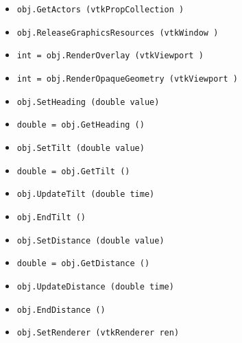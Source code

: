 \begin{itemize}
\item  \verb|obj.GetActors (vtkPropCollection )|

\item  \verb|obj.ReleaseGraphicsResources (vtkWindow )|

\item  \verb|int = obj.RenderOverlay (vtkViewport )|

\item  \verb|int = obj.RenderOpaqueGeometry (vtkViewport )|

\item  \verb|obj.SetHeading (double value)|

\item  \verb|double = obj.GetHeading ()|

\item  \verb|obj.SetTilt (double value)|

\item  \verb|double = obj.GetTilt ()|

\item  \verb|obj.UpdateTilt (double time)|

\item  \verb|obj.EndTilt ()|

\item  \verb|obj.SetDistance (double value)|

\item  \verb|double = obj.GetDistance ()|

\item  \verb|obj.UpdateDistance (double time)|

\item  \verb|obj.EndDistance ()|

\item  \verb|obj.SetRenderer (vtkRenderer ren)|

\end{itemize}

